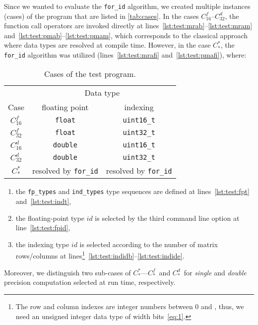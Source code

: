 \documentclass[10pt,a4paper]{article}
\theoremstyle{definition}\newtheorem{problem}{Problem}
\providecommand{\symidb}{\ensuremath{\mathit{id}}}
\providecommand{\symidbx}{\symidb\xspace}
\providecommand{\forid}{\texttt{for\_id}\xspace}
\providecommand{\casex}[1]{\ensuremath{#1}}
\providecommand{\caseA}{\casex{C_{16}^f}}
\providecommand{\caseB}{\casex{C_{32}^f}}
\providecommand{\caseC}{\casex{C_{16}^d}}
\providecommand{\caseD}{\casex{C_{32}^d}}
\providecommand{\caseE}{\casex{C_*^*}}
\providecommand{\caseEf}{\casex{C_*^f}}
\providecommand{\caseEd}{\casex{C_*^d}}
\begin{document}
Since we wanted to evaluate the \texttt{for\_id} algorithm, we created multiple instances (cases) of the program that are listed in \autoref{tab:cases}. In the cases \caseA--\caseD, the function call operators are invoked directly at lines~\ref{lst:test:mrab}--\ref{lst:test:mram} and~\ref{lst:test:pmab}--\ref{lst:test:pmam}, which corresponds to the classical approach where data types are resolved at compile time. However, in the case \caseE, the \forid algorithm was utilized (lines~\ref{lst:test:mrafi} and~\ref{lst:test:pmafi}), where:
\renewcommand{\arraystretch}{1.15}
\renewcommand{\tabcolsep}{2.6mm}
\begin{table}[t]
\caption{Cases of the test program.}
\begin{center}
\begin{tabular}{ccc}
\toprule
        & \multicolumn{2}{c}{Data type}          \\ \cmidrule(l){2-3}
Case    & floating point    & indexing           \\ \cmidrule(r){1-1} \cmidrule(l){2-3}
\caseA & \texttt{float}     & \texttt{uint16\_t} \\
\caseB & \texttt{float}     & \texttt{uint32\_t} \\
\caseC & \texttt{double}    & \texttt{uint16\_t} \\
\caseD & \texttt{double}    & \texttt{uint32\_t} \\
\caseE & resolved by \forid & resolved by \forid \\
\bottomrule
\end{tabular}
\end{center}
\label{tab:cases}
\end{table}
\begin{enumerate}

\item the \texttt{fp\_types} and \texttt{ind\_types} type sequences are defined at lines~\ref{lst:test:fpt} and~\ref{lst:test:indt},

\item the floating-point type \symidbx is selected by the third command line option at line~\ref{lst:test:fpid},

\item the indexing type \symidbx is selected according to the number of matrix rows/columns at lines\footnote{The row and column indexes are integer numbers between 0 and , thus, we need an unsigned integer data type of width  bits~\eqref{eq:1}.}~\ref{lst:test:indidb}--\ref{lst:test:indide}.

\end{enumerate}
\noindent
Moreover, we distinguish two sub-cases of \caseE---\caseEf\ and \caseEd\ for  \emph{single} and \emph{double} precision computation selected at run time, respectively.
\end{document}
